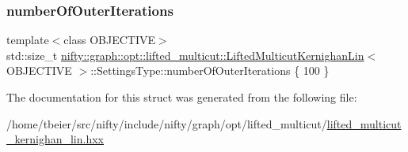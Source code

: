 \subsubsection{\texorpdfstring{number\+Of\+Outer\+Iterations}{numberOfOuterIterations}}
{\footnotesize\ttfamily template$<$class O\+B\+J\+E\+C\+T\+I\+VE$>$ \\
std\+::size\+\_\+t \hyperlink{classnifty_1_1graph_1_1opt_1_1lifted__multicut_1_1LiftedMulticutKernighanLin}{nifty\+::graph\+::opt\+::lifted\+\_\+multicut\+::\+Lifted\+Multicut\+Kernighan\+Lin}$<$ O\+B\+J\+E\+C\+T\+I\+VE $>$\+::Settings\+Type\+::number\+Of\+Outer\+Iterations \{ 100 \}}



The documentation for this struct was generated from the following file\+:\begin{DoxyCompactItemize}
\item 
/home/tbeier/src/nifty/include/nifty/graph/opt/lifted\+\_\+multicut/\hyperlink{lifted__multicut__kernighan__lin_8hxx}{lifted\+\_\+multicut\+\_\+kernighan\+\_\+lin.\+hxx}\end{DoxyCompactItemize}
